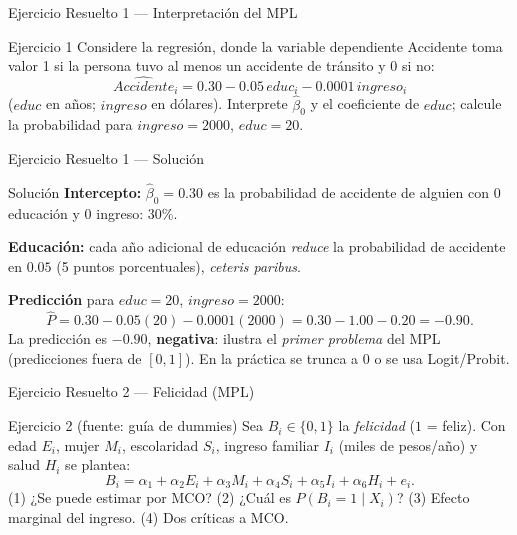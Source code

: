 \documentclass{beamer}
\begin{document}
\begin{frame}{Ejercicio Resuelto 1 — Interpretación del MPL}

\begin{block}{Ejercicio 1}
Considere la regresión, donde la variable dependiente {\color{blue}Accidente} toma valor 1 si la persona tuvo al menos un accidente de tránsito y 0 si no:
\[
\hat{Accidente}_i = 0.30 - 0.05\,educ_i - 0.0001\,ingreso_i
\]
($educ$ en años; $ingreso$ en dólares). Interprete $\hat\beta_0$ y el coeficiente de $educ$; calcule la probabilidad para $ingreso=2000$, $educ=20$.
\end{block}

\end{frame}

\begin{frame}{Ejercicio Resuelto 1 — Solución}
\begin{exampleblock}{Solución}
\textbf{Intercepto:} $\hat\beta_0=0.30$ es la probabilidad de accidente de alguien con $0$ educación y $0$ ingreso: $30\%$.

\textbf{Educación:} cada año adicional de educación \emph{reduce} la probabilidad de accidente en $0.05$ (5 puntos porcentuales), \emph{ceteris paribus}.

\textbf{Predicción} para $educ=20$, $ingreso=2000$:
\[
\hat P = 0.30 - 0.05(20) - 0.0001(2000) = 0.30 - 1.00 - 0.20 = -0.90.
\]
\pause
La predicción es $\mathbf{-0.90}$, \textbf{negativa}: ilustra el \emph{primer problema} del MPL (predicciones fuera de $[0,1]$). En la práctica se trunca a $0$ o se usa Logit/Probit.
\end{exampleblock}
\end{frame}

\begin{frame}{Ejercicio Resuelto 2 — Felicidad (MPL)}
\begin{block}{Ejercicio 2 (fuente: guía de dummies)}
Sea $B_i\in\{0,1\}$ la \textit{felicidad} ($1$ = feliz). Con edad $E_i$, mujer $M_i$, escolaridad $S_i$, ingreso familiar $I_i$ (miles de pesos/año) y salud $H_i$ se plantea:
\[
B_i = \alpha_1 + \alpha_2 E_i + \alpha_3 M_i + \alpha_4 S_i + \alpha_5 I_i + \alpha_6 H_i + e_i.
\]
(1) ¿Se puede estimar por MCO? \; (2) ¿Cuál es $P(B_i=1\mid X_i)$? \; (3) Efecto marginal del ingreso. \; (4) Dos críticas a MCO.
\end{block}
\end{frame}
\end{document}
